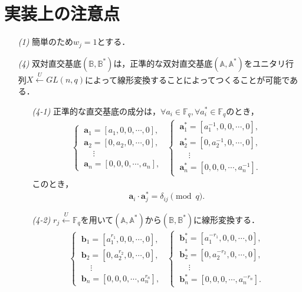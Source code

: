 \documentclass[a4paper]{jsarticle}
\begin{document}
\section{実装上の注意点}
\begin{enumerate}
\item[\it{(1)}] 簡単のため$w_j=1$とする．
\item[\it{(4)}] 双対直交基底$(\mathbb{B},\mathbb{B}^*)$は，正準的な双対直交基底$(\mathbb{A},\mathbb{A}^*)$をユニタリ行列$X\overset{U}{\leftarrow}GL(n,q)$によって線形変換することによってつくることが可能である．
\begin{enumerate}
\item[\it{(4-1)}] 正準的な直交基底の成分は，$\forall a_i\in\mathbb{F}_q, \forall a^*_i\in\mathbb{F}_q$のとき，
\begin{align}
\begin{cases}
\ \bm{a}_1 = [a_1,0,0,\cdots,0],\\
\ \bm{a}_2 = [0,a_2,0,\cdots,0],\\
\ \ \ \ \ \ \vdots\\
\ \bm{a}_n = [0,0,0,\cdots,a_n],
\end{cases}\ \ 
\begin{cases}
\ \bm{a}^*_1 = [a^{-1}_1,0,0,\cdots,0],\\
\ \bm{a}^*_2 = [0,a^{-1}_2,0,\cdots,0],\\
\ \ \ \ \ \ \vdots\\
\ \bm{a}^*_n = [0,0,0,\cdots,a^{-1}_n].
\end{cases}
\end{align}
このとき，
\begin{align}
\bm{a}_i\cdot \bm{a}^*_j = \delta_{ij}\pmod{q}.
\end{align}


\item[\it{(4-2)}] $r_j \overset{U}{\leftarrow}\mathbb{F}_q$を用いて$(\mathbb{A},\mathbb{A}^*)$から$(\mathbb{B},\mathbb{B}^*)$に線形変換する．
\begin{align}
\begin{cases}
\ \bm{b}_1 = [a_1^{r_1},0,0,\cdots,0],\\
\ \bm{b}_2 = [0,a_2^{r_2},0,\cdots,0],\\
\ \ \ \ \ \ \vdots\\
\ \bm{b}_n = [0,0,0,\cdots,a_n^{r_n}],
\end{cases}\ \ 
\begin{cases}
\ \bm{b}^*_1 = [a^{-r_1}_1,0,0,\cdots,0],\\
\ \bm{b}^*_2 = [0,a^{-r_2}_2,0,\cdots,0],\\
\ \ \ \ \ \ \vdots\\
\ \bm{b}^*_n = [0,0,0,\cdots,a^{-r_n}_n].
\end{cases}
\end{align}


\end{enumerate}
\end{enumerate}
\end{document}
